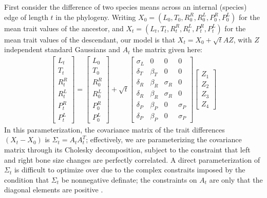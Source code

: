 \documentclass[12pt]{article}
\begin{document}
First consider the difference of two species means across an internal (species) edge of length $t$ in the phylogeny.
Writing $X_0=(L_0,T_0,R^R_0,R^L_0,P^R_0,P^L_0)$ for the mean trait values of the ancestor,
and $X_t=(L_t,T_t,R^R_t,R^L_t,P^R_t,P^L_t)$ for the mean trait values of the descendant,
our model is that $X_t = X_0 + \sqrt{t} A Z$, with $Z$ independent standard Gaussians and $A_t$ the matrix given here:
\begin{align} \label{eqn:species_matrix}
\begin{bmatrix}
    L_t \\ T_t \\ R^R_t \\ R^L_t \\ P^R_t \\ P^L_t 
\end{bmatrix}
=
\begin{bmatrix}
    L_0 \\ T_0 \\ R^R_0 \\ R^L_0 \\ P^R_0 \\ P^L_0 
\end{bmatrix}
+
\sqrt{t}
\begin{bmatrix}
    \sigma_L &  0  & 0  & 0  \\
    \delta_T   &  \beta_T   & 0  &   0 \\
    \delta_R   &  \beta_R   & \sigma_R   &   0 \\
    \delta_R   &  \beta_R   & \sigma_R   &   0 \\
    \delta_P   &  \beta_P   & 0  &   \sigma_P  \\
    \delta_P   &  \beta_P   & 0  &   \sigma_P  
\end{bmatrix}
\begin{bmatrix}
    Z_1 \\ Z_2 \\ Z_3 \\ Z_4
\end{bmatrix}
\end{align}
In this parameterization, the covariance matrix of the trait differences $(X_t - X_0)$ is $\Sigma_t = A_t A_t^T$;
effectively, we are parameterizing the covariance matrix through its Cholesky decomposition,
subject to the constraint that left and right bone size changes are perfectly correlated.
A direct parameterization of $\Sigma_t$ is difficult to optimize over due to the complex constraits imposed by
the condition that $\Sigma_t$ be nonnegative definate;
the constraints on $A_t$ are only that the diagonal elements are positive \citep{pourahmadi1999joint}.
\end{document}
